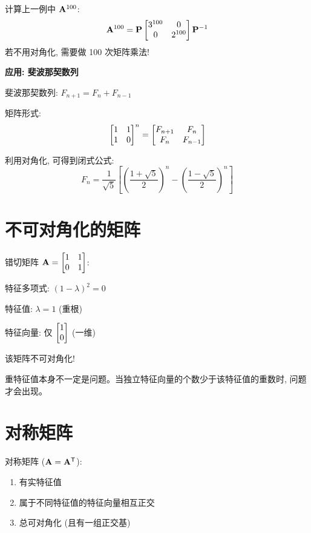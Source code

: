 \begin{example}
计算上一例中 $\mathbf{A}^{100}$:
\[
\mathbf{A}^{100} = \mathbf{P} \begin{bmatrix} 3^{100} & 0 \\ 0 & 2^{100} \end{bmatrix} \mathbf{P}^{-1}
\]
若不用对角化, 需要做 100 次矩阵乘法!
\end{example}

\begin{practical}
\textbf{应用: 斐波那契数列}

斐波那契数列: $F_{n+1} = F_n + F_{n-1}$

矩阵形式:
\[
\begin{bmatrix} 1 & 1 \\ 1 & 0 \end{bmatrix}^n = \begin{bmatrix} F_{n+1} & F_n \\ F_n & F_{n-1} \end{bmatrix}
\]

利用对角化, 可得到闭式公式:
\[
F_n = \frac{1}{\sqrt{5}}\left[\left(\frac{1+\sqrt{5}}{2}\right)^n - \left(\frac{1-\sqrt{5}}{2}\right)^n\right]
\]
\end{practical}

\section{不可对角化的矩阵}

\begin{example}
错切矩阵 $\mathbf{A} = \begin{bmatrix} 1 & 1 \\ 0 & 1 \end{bmatrix}$:

特征多项式: $(1-\lambda)^2 = 0$

特征值: $\lambda = 1$ (重根)

特征向量: 仅 $\begin{bmatrix} 1 \\ 0 \end{bmatrix}$ (一维)

该矩阵不可对角化!
\end{example}

\begin{warning}
重特征值本身不一定是问题。当独立特征向量的个数少于该特征值的重数时, 问题才会出现。
\end{warning}

\section{对称矩阵}

\begin{theorem}[谱定理]
对称矩阵 ($\mathbf{A} = \mathbf{A}^{\mathsf{T}}$):
\begin{enumerate}
    \item 有实特征值
    \item 属于不同特征值的特征向量相互正交
    \item 总可对角化 (且有一组正交基)
\end{enumerate}
\end{theorem}

